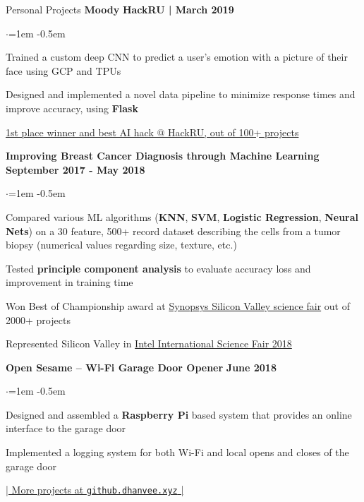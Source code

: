 \documentclass[mm,centered]{resume} %
\begin{document}
\begin{rSection}{Personal Projects}
{\bf Moody}  \hfill {\bf HackRU | March 2019}
 \begin{list}{$\cdot$}{\leftmargin=1em} %
   \itemsep -0.5em \vspace{-0.5em} %
	\item 
		Trained a custom deep CNN to predict a user’s emotion with a picture of their face using GCP and TPUs
	\item 
		Designed and implemented a novel data pipeline to minimize response times and improve accuracy, using \textbf{Flask}
	\item
		\underline{1st place winner and best AI hack @ HackRU, out of 100+ projects}
  \end{list}

{\bf Improving Breast Cancer Diagnosis through Machine Learning} \hfill {\bf September 2017 - May 2018}
 \begin{list}{$\cdot$}{\leftmargin=1em} %
   \itemsep -0.5em \vspace{-0.5em} %
	\item 
		Compared various ML algorithms (\textbf{KNN}, \textbf{SVM}, \textbf{Logistic Regression}, \textbf{Neural Nets}) on a 30 feature, 500+ record dataset describing the cells from a tumor biopsy (numerical values regarding size, texture, etc.)
	\item
		Tested \textbf{principle component analysis} to evaluate accuracy loss and improvement in training time
	\item
		Won Best of Championship award at \underline{Synopsys Silicon Valley science fair} out of 2000+ projects
	\item
		Represented Silicon Valley in \underline{Intel International Science Fair 2018}
  \end{list}

{\bf Open Sesame – Wi-Fi Garage Door Opener}  \hfill {\bf June 2018}
 \begin{list}{$\cdot$}{\leftmargin=1em} %
   \itemsep -0.5em \vspace{-0.5em} %
	\item 
		Designed and assembled a \textbf{Raspberry Pi} based system that provides an online interface to the garage door
	\item
		Implemented a logging system for both Wi-Fi and local opens and closes of the garage door
  \end{list}
\vspace{-1.25mm}
\begin{center}
	\href{http://github.dhanvee.xyz}{| More projects at \texttt{github.dhanvee.xyz} |}
\end{center}
\vspace{-2mm}
\end{rSection}
\end{document}
